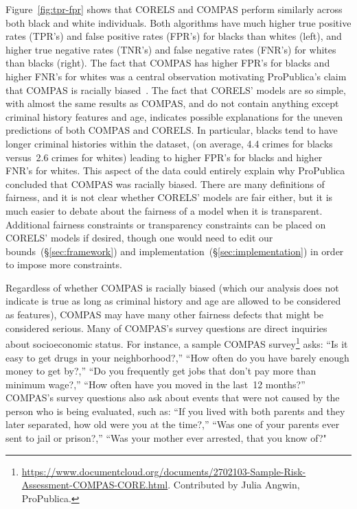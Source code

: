 Figure~\ref{fig:tpr-fpr} shows that CORELS and COMPAS perform similarly across both black and white individuals.
%
Both algorithms have much higher true positive rates (TPR's) and false positive rates (FPR's) for blacks than whites (left), and higher true negative rates (TNR's) and false negative rates (FNR's) for whites than blacks (right).
%
The fact that COMPAS has higher FPR's for blacks and higher FNR's for whites was a central observation motivating ProPublica's claim that COMPAS is racially biased~\citep{LarsonMaKiAn16}.
%
The fact that CORELS' models are so simple, with almost the same results as COMPAS, and do not contain anything except criminal history features and age, indicates possible explanations for the uneven predictions of both COMPAS and CORELS.
%
In particular, blacks tend to have longer criminal histories within the dataset,
(on average, 4.4 crimes for blacks versus~2.6 crimes for whites)
leading to higher FPR's for blacks and higher FNR's for whites.
%
This aspect of the data could entirely explain why ProPublica concluded that COMPAS was racially biased.
%
There are many definitions of fairness, and it is not clear whether CORELS' models are fair either, but it is much easier to debate about the fairness of a model when it is transparent.
%
Additional fairness constraints or transparency constraints can be placed on CORELS' models if desired, though one would need to edit our bounds~(\S\ref{sec:framework}) and implementation~(\S\ref{sec:implementation}) in order to impose more constraints.

Regardless of whether COMPAS is racially biased (which our analysis does not indicate is true as long as criminal history and age are allowed to be considered as features),
COMPAS may have many other fairness defects that might be considered serious.
%
Many of COMPAS's survey questions are direct inquiries about socioeconomic status.
%
For instance, a sample COMPAS survey\footnote{
\url{https://www.documentcloud.org/documents/2702103-Sample-Risk-Assessment-COMPAS-CORE.html}.
Contributed by Julia Angwin, ProPublica.} asks:
``Is it easy to get drugs in your neighborhood?,''
``How often do you have barely enough money to get by?,''
``Do you frequently get jobs that don't pay more than minimum wage?,''
``How often have you moved in the last~12 months?''
%
COMPAS's survey questions also ask about events that were not caused by the person who is being evaluated, such as:
``If you lived with both parents and they later separated, how old were you at the time?,''
``Was one of your parents ever sent to jail or prison?,''
``Was your mother ever arrested, that you know of?"

